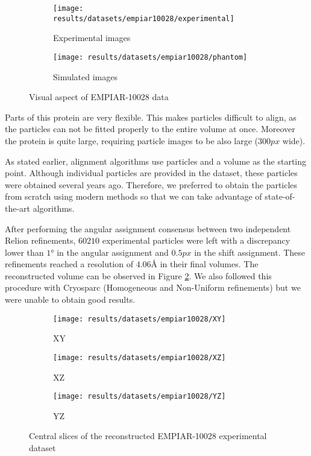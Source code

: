 \documentclass[../main.tex]{subfiles}
\begin{document}
\begin{figure}[htbp]
    \centering
    \begin{subfigure}[b]{0.45\textwidth}
         \centering
         \texttt{[image: results/datasets/empiar10028/experimental]}
         \caption{Experimental images}
    \end{subfigure}
    \hfill
    \begin{subfigure}[b]{0.45\textwidth}
         \centering
         \texttt{[image: results/datasets/empiar10028/phantom]}
         \caption{Simulated images}
    \end{subfigure}
    \caption{Visual aspect of EMPIAR-10028 data}
    \label{fig:5:empiar10028}
\end{figure}

Parts of this protein are very flexible. This makes particles difficult to align, as the particles can not be fitted properly to the entire volume at once. Moreover the protein is quite large, requiring particle images to be also large ($300 \si{px}$ wide).

As stated earlier, alignment algorithms use particles and a volume as the starting point. Although individual particles are provided in the dataset, these particles were obtained several years ago. Therefore, we preferred to obtain the particles from scratch using modern methods so that we can take advantage of state-of-the-art algorithms.

After performing the angular assignment consensus between two independent Relion refinements, $60210$ experimental particles were left with a discrepancy lower than $1 \si{\degree}$ in the angular assignment and $0.5 \si{px}$ in the shift assignment. These refinements reached a resolution of $4.06 \si{\angstrom}$ in their final volumes. The reconstructed volume can be observed in Figure \ref{fig:5:empiar10028_rec}. We also followed this procedure with Cryosparc (Homogeneous and Non-Uniform refinements) but we were unable to obtain good results.

\begin{figure}[htbp]
    \centering
    \begin{subfigure}[b]{0.3\textwidth}
         \centering
         \texttt{[image: results/datasets/empiar10028/XY]}
         \caption{XY}
    \end{subfigure}
    \hfill
    \begin{subfigure}[b]{0.3\textwidth}
         \centering
         \texttt{[image: results/datasets/empiar10028/XZ]}
         \caption{XZ}
    \end{subfigure}
    \hfill
    \begin{subfigure}[b]{0.3\textwidth}
         \centering
         \texttt{[image: results/datasets/empiar10028/YZ]}
         \caption{YZ}
    \end{subfigure}

    \caption{Central slices of the reconstructed EMPIAR-10028 experimental dataset}
    \label{fig:5:empiar10028_rec}
\end{figure}
\end{document}
